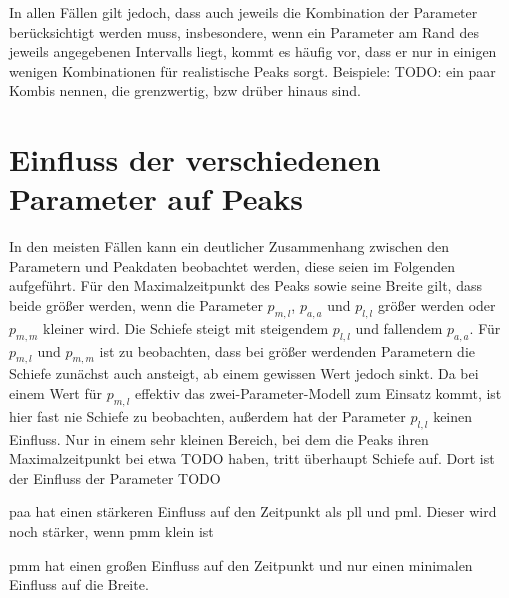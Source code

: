 In allen Fällen gilt jedoch, dass auch jeweils die Kombination der Parameter berücksichtigt werden muss, insbesondere, wenn ein Parameter am Rand des jeweils angegebenen Intervalls liegt, kommt es häufig vor, dass er nur in einigen wenigen Kombinationen für realistische Peaks sorgt.
Beispiele: TODO: ein paar Kombis nennen, die grenzwertig, bzw drüber hinaus sind.



\section{Einfluss der verschiedenen Parameter auf Peaks}

In den meisten Fällen kann ein deutlicher Zusammenhang zwischen den Parametern und Peakdaten beobachtet werden, diese seien im Folgenden aufgeführt.
Für den Maximalzeitpunkt des Peaks sowie seine Breite gilt, dass beide größer werden, wenn die Parameter $p_{m,l}$, $p_{a,a}$ und $p_{l,l}$ größer werden oder $p_{m,m}$ kleiner wird. 
Die Schiefe steigt mit steigendem $p_{l,l}$ und fallendem $p_{a,a}$. Für $p_{m,l} \text{ und } p_{m,m}$ ist zu beobachten, dass bei größer werdenden Parametern die Schiefe zunächst auch ansteigt, ab einem gewissen Wert jedoch sinkt. 
Da bei einem Wert für $p_{m,l}$ effektiv das zwei-Parameter-Modell zum Einsatz kommt, ist hier fast nie Schiefe zu beobachten, außerdem hat der Parameter $p_{l,l}$ keinen Einfluss. Nur in einem sehr kleinen Bereich, bei dem die Peaks ihren Maximalzeitpunkt bei etwa TODO haben, tritt überhaupt Schiefe auf. Dort ist der Einfluss der Parameter TODO

paa hat einen stärkeren Einfluss auf den Zeitpunkt als pll und pml. Dieser wird noch stärker, wenn pmm klein ist

pmm hat einen großen Einfluss auf den Zeitpunkt und nur einen minimalen Einfluss auf die Breite.



